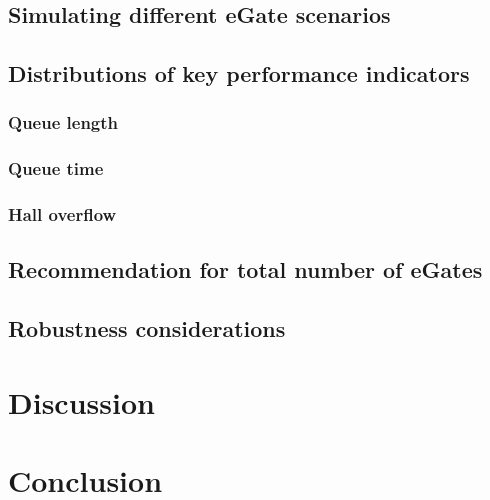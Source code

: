 \documentclass[12pt]{article}
\begin{document}

\subsection{Simulating different eGate scenarios}

\subsection{Distributions of key performance indicators}

\subsubsection{Queue length}
\subsubsection{Queue time}
\subsubsection{Hall overflow}
 

\subsection{Recommendation for total number of eGates}

\subsection{Robustness considerations}

\section{Discussion}
\section{Conclusion}
% 
\end{document}
